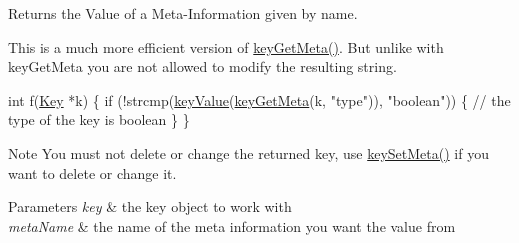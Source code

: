Returns the Value of a Meta-\/\+Information given by name. 

This is a much more efficient version of \hyperlink{group__keymeta_ga9ed3875495ddb3d8a8d29158a60a147c}{key\+Get\+Meta()}. But unlike with key\+Get\+Meta you are not allowed to modify the resulting string.


\begin{DoxyCode}
\textcolor{keywordtype}{int} f(\hyperlink{classkdb_1_1Key_a5679f5cae63caddd64a60388b9cc77fa}{Key} *k)
\{
        \textcolor{keywordflow}{if} (!strcmp(\hyperlink{group__keyvalue_ga6f29609c5da53c6dc26a98678d5752af}{keyValue}(\hyperlink{group__keymeta_ga9ed3875495ddb3d8a8d29158a60a147c}{keyGetMeta}(k, \textcolor{stringliteral}{"type"})), \textcolor{stringliteral}{"boolean"}))
        \{
                \textcolor{comment}{// the type of the key is boolean}
        \}
\}
\end{DoxyCode}


\begin{DoxyNote}{Note}
You must not delete or change the returned key, use \hyperlink{group__keymeta_gae1f15546b234ffb6007d8a31178652b9}{key\+Set\+Meta()} if you want to delete or change it.
\end{DoxyNote}

\begin{DoxyParams}{Parameters}
{\em key} & the key object to work with \\
\hline
{\em meta\+Name} & the name of the meta information you want the value from \\
\hline
\end{DoxyParams}


